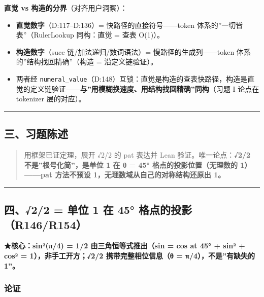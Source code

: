 \documentclass[
]{article}
\providecommand{\tightlist}{%
 \setlength{\itemsep}{0pt}\setlength{\parskip}{0pt}}
\begin{document}
\textbf{直觉 vs 构造的分界}（对齐用户洞察）：

\begin{itemize}
\tightlist
\item
 \textbf{直觉数字}（D:117--D:136）= 快路径的直接符号------token
 体系的''一切皆表''（RulerLookup 同构：直觉 = 查表 O(1)）。
\item
 \textbf{构造数字}（succ 链/加法递归/数词语法）=
 慢路径的生成列------token 体系的''结构找回精确''（构造 =
 沿定义链验证）。
\item
 两者经
 \texttt{numeral\_value}（D:148）互锁：直觉是构造的查表快路径，构造是直觉的定义链验证------\textbf{与''用模糊换速度、用结构找回精确''同构}（习题
 I 论点在 tokenizer 层的对应）。
\end{itemize}

\begin{center}\rule{0.5\linewidth}{0.5pt}\end{center}

\subsection{三、习题陈述}\label{ux4e09ux4e60ux9898ux9648ux8ff0}

\begin{quote}
用框架已证定理，展开 √2/2 的 pat 表达并 Lean
验证。唯一论点：\textbf{√2/2 不是''根号化简''，是单位 1 在 θ = 45°
格点的投影位置（无理数的 1）------pat 方法不预设
1，无理数域从自己的对称结构还原出 1。}
\end{quote}

\begin{center}\rule{0.5\linewidth}{0.5pt}\end{center}

\subsection{四、√2/2 = 单位 1 在 45°
格点的投影（R146/R154）}\label{ux56db22-ux5355ux4f4d-1-ux5728-45-ux683cux70b9ux7684ux6295ux5f71r146r154}

\textbf{★核心：sin²(π/4) = 1/2 由三角恒等式推出（sin = cos at 45° + sin²
+ cos² = 1），非手工开方；√2/2 携带完整相位信息（θ =
π/4），不是''有缺失的 1''。}

\subsubsection{论证}\label{ux8bbaux8bc1}
\end{document}
